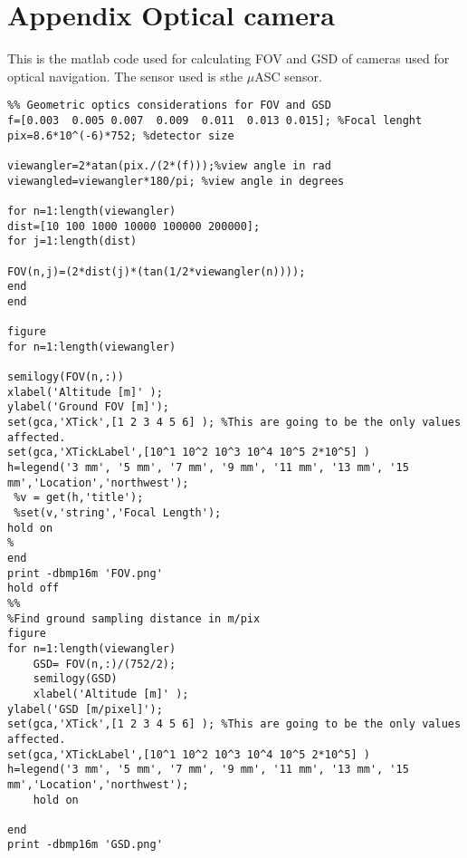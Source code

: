 \chapter{Appendix Optical camera}\label{app:majamatlab}

This is the matlab code used for calculating FOV and GSD of cameras used for optical navigation. The sensor used is sthe $\mu$ASC sensor. 

\begin{lstlisting}
%% Geometric optics considerations for FOV and GSD 
f=[0.003  0.005 0.007  0.009  0.011  0.013 0.015]; %Focal lenght
pix=8.6*10^(-6)*752; %detector size

viewangler=2*atan(pix./(2*(f)));%view angle in rad
viewangled=viewangler*180/pi; %view angle in degrees

for n=1:length(viewangler)
dist=[10 100 1000 10000 100000 200000];
for j=1:length(dist)

FOV(n,j)=(2*dist(j)*(tan(1/2*viewangler(n))));
end 
end 

figure
for n=1:length(viewangler)

semilogy(FOV(n,:))
xlabel('Altitude [m]' );
ylabel('Ground FOV [m]');
set(gca,'XTick',[1 2 3 4 5 6] ); %This are going to be the only values affected.
set(gca,'XTickLabel',[10^1 10^2 10^3 10^4 10^5 2*10^5] )
h=legend('3 mm', '5 mm', '7 mm', '9 mm', '11 mm', '13 mm', '15 mm','Location','northwest');
 %v = get(h,'title');
 %set(v,'string','Focal Length');
hold on
%
end 
print -dbmp16m 'FOV.png'
hold off
%%
%Find ground sampling distance in m/pix
figure
for n=1:length(viewangler)
    GSD= FOV(n,:)/(752/2); 
    semilogy(GSD)
    xlabel('Altitude [m]' );
ylabel('GSD [m/pixel]');
set(gca,'XTick',[1 2 3 4 5 6] ); %This are going to be the only values affected.
set(gca,'XTickLabel',[10^1 10^2 10^3 10^4 10^5 2*10^5] )
h=legend('3 mm', '5 mm', '7 mm', '9 mm', '11 mm', '13 mm', '15 mm','Location','northwest');
    hold on 
    
end
print -dbmp16m 'GSD.png'

\end{lstlisting}

